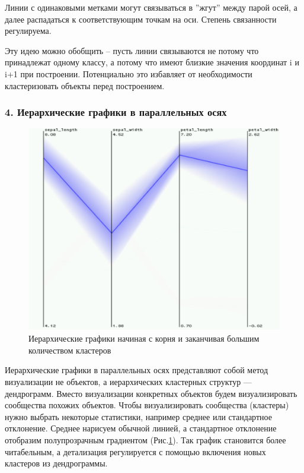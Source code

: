 \documentclass[12pt,fleqn]{article}
\begin{document}
Линии с одинаковыми метками могут связываться в ''жгут'' между парой осей, а 
далее распадаться к соответствующим точкам на оси. Степень связанности регулируема.\cite{bundling}

Эту идею можно обобщить -- пусть линии связываются не потому что принадлежат одному классу, 
а потому что имеют близкие значения координат i и i+1 при построении. Потенциально это избавляет
от необходимости кластеризовать объекты перед построением.

\subsubsection{4. Иерархические графики в параллельных осях}
\begin{figure}[htb]
    \centering
    \includegraphics[width=14cm]{hierarchical_1.png}
    \caption{Иерархические графики начиная с корня и заканчивая большим количеством кластеров}
    \label{hierarchical_coords}
\end{figure}
Иерархические графики в параллельных осях представляют собой метод визуализации не объектов, а иерархических
кластерных структур --- дендрограмм. Вместо визуализации конкретных объектов будем
визуализировать сообщества похожих объектов. Чтобы визуализировать сообщества (кластеры)
нужно выбрать некоторые статистики, например среднее или стандартное отклонение. Среднее нарисуем обычной линией, а 
стандартное отклонение отобразим полупрозрачным градиентом (Рис.\ref{hierarchical_coords}).
Так график становится более читабельным, а детализация регулируется с
помощью включения новых кластеров из дендрограммы.\cite{hierarchical}
\end{document}
